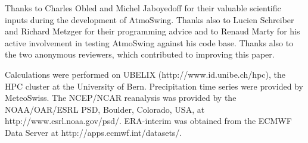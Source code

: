 \documentclass[gmdd]{copernicus}
\begin{document}















\begin{acknowledgements}
Thanks to Charles Obled and Michel Jaboyedoff for their valuable scientific inputs during the development of AtmoSwing. Thanks also to Lucien Schreiber and Richard Metzger for their programming advice and to Renaud Marty for his active involvement in testing AtmoSwing against his code base. Thanks also to the two anonymous reviewers, which contributed to improving this paper.

Calculations were performed on UBELIX (http://www.id.unibe.ch/hpc), the HPC cluster at the University of Bern. Precipitation time series were provided by MeteoSwiss. The NCEP/NCAR reanalysis was provided by the NOAA/OAR/ESRL PSD, Boulder, Colorado, USA, at http://www.esrl.noaa.gov/psd/. ERA-interim was obtained from the ECMWF Data Server at http://apps.ecmwf.int/datasets/. 
\end{acknowledgements}
\end{document}
